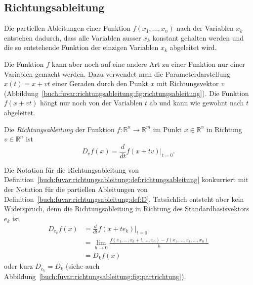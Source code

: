 %
%
\subsection{Richtungsableitung}
Die partiellen Ableitungen einer Funktion $f(x_1,\dots,x_n)$
nach der Variablen $x_k$ entstehen dadurch, dass alle Variablen
ausser $x_k$ konstant gehalten werden und die so entstehende
Funktion der einzigen Variablen $x_k$ abgeleitet wird.


Die Funktion $f$ kann aber noch auf eine andere Art zu einer
Funktion nur einer Variablen gemacht werden.
Dazu verwendet man die Parameterdarstellung $x(t) = x + vt$ einer
Geraden durch den Punkt $x$ mit Richtungsvektor $v$
(Abbildung~\ref{buch:fuvar:richtungsableitung:fig:richtungsableitung}).
Die Funktion $f(x+vt)$ hängt nur noch von der Variablen $t$ ab
und kann wie gewohnt nach $t$ abgeleitet.

\begin{definition}
\label{buch:fuvar:richtungsableitung:def:richtungsableitung}
Die {\em Richtungsableitung} der Funktion $f\colon\mathbb{R}^n\to\mathbb{R}^m$
%
im Punkt $x\in\mathbb{R}^n$ in Richtung $v\in\mathbb{R}^n$ ist 
\[
D_vf(x)
=
\frac{d}{dt}f(x+tv)\bigg|_{t=0}.
\]
\end{definition}

Die Notation für die Richtungsableitung von
Definition~\ref{buch:fuvar:richtungsableitung:def:richtungsableitung}
konkurriert mit der Notation für die partiellen Ableitungen von
Definition~\ref{buch:fuvar:richtungsableitung:def:D}.
Tatsächlich entsteht aber kein Widerspruch, denn die 
Richtungsableitung in Richtung des Standardbasisvektors $e_k$ ist
\begin{align*}
D_{e_k}f(x)
&=
\frac{d}{dt} f(x+te_k)\bigg|_{t=0}
\\
&=
\lim_{h\to 0}
\frac{f(x_1,\dots,x_k+t,\dots,x_n)-f(x_1,\dots,x_k,\dots,x_n)}{h}
\\
&=
D_kf(x)
\end{align*}
oder kurz $D_{e_k}=D_k$
(siehe auch Abbildung~\ref{buch:fuvar:richtungsableitung:fig:partrichtung}).


